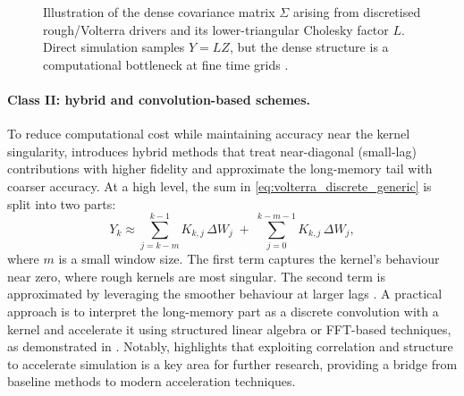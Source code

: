 \documentclass[12pt,a4paper]{article}
\theoremstyle{definition}
\theoremstyle{plain}
\theoremstyle{remark}
\theoremstyle{plain}
\begin{document}
\begin{figure}[H]
\centering
{}
\caption{Illustration of the dense covariance matrix $\Sigma$ arising from discretised rough/Volterra drivers and its lower-triangular Cholesky factor $L$. Direct simulation samples $Y=LZ$, but the dense structure is a computational bottleneck at fine time grids \cite{BayerFriz2016}.}
\label{fig:covariance_cholesky_cartoon}
\end{figure}
\FloatBarrier

\paragraph{Class II: hybrid and convolution-based schemes.}
To reduce computational cost while maintaining accuracy near the kernel singularity, \cite{BayerFriz2016} introduces hybrid methods that treat near-diagonal (small-lag) contributions with higher fidelity and approximate the long-memory tail with coarser accuracy. At a high level, the sum in \eqref{eq:volterra_discrete_generic} is split into two parts:
\[
Y_k \approx \sum_{j=k-m}^{k-1} K_{k,j}\,\Delta W_j \;+\; \sum_{j=0}^{k-m-1} K_{k,j}\,\Delta W_j,
\]
where $m$ is a small window size. The first term captures the kernel's behaviour near zero, where rough kernels are most singular. The second term is approximated by leveraging the smoother behaviour at larger lags \cite{BayerFriz2016}. A practical approach is to interpret the long-memory part as a discrete convolution with a kernel and accelerate it using structured linear algebra or FFT-based techniques, as demonstrated in \cite{BayerFriz2016}. Notably, \cite{BayerFriz2016} highlights that exploiting correlation and structure to accelerate simulation is a key area for further research, providing a bridge from baseline methods to modern acceleration techniques.
\end{document}
